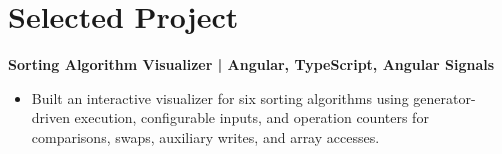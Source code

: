 \documentclass[a4paper,10pt]{article}
\begin{document}
\section{Selected Project}
\textbf{Sorting Algorithm Visualizer | Angular, TypeScript, Angular Signals}\par
\begin{itemize}
  \item Built an interactive visualizer for six sorting algorithms using generator-driven execution, configurable inputs, and operation counters for comparisons, swaps, auxiliary writes, and array accesses.
\end{itemize}
\end{document}
